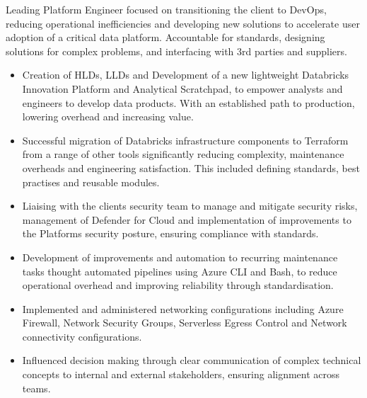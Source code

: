 \documentclass[10pt,a4paper,ragged2e]{maltacv}
\begin{document}


\makecvheader


\bigskip


\bigskip

Leading Platform Engineer focused on transitioning the client to DevOps, reducing operational inefficiencies and developing new solutions to accelerate user adoption of a critical data platform. Accountable for standards, designing solutions for complex problems, and interfacing with 3rd parties and suppliers.

\bigskip

\begin{itemize}
  \item Creation of HLDs, LLDs and Development of a new lightweight Databricks Innovation Platform and Analytical Scratchpad, to empower analysts and engineers to develop data products. With an established path to production, lowering overhead and increasing value.
  \item Successful migration of Databricks infrastructure components to Terraform from a range of other tools significantly reducing complexity, maintenance overheads and engineering satisfaction. This included defining standards, best practises and reusable modules.
  \item Liaising with the clients security team to manage and mitigate security risks, management of Defender for Cloud and implementation of improvements to the Platforms security posture, ensuring compliance with standards.
  \item Development of improvements and automation to recurring maintenance tasks thought automated pipelines using Azure CLI and Bash, to reduce operational overhead and improving reliability through standardisation.
  \item Implemented and administered networking configurations including Azure Firewall, Network Security Groups, Serverless Egress Control and Network connectivity configurations.
  \item Influenced decision making through clear communication of complex technical concepts to internal and external stakeholders, ensuring alignment across teams.
\end{itemize}
\end{document}
